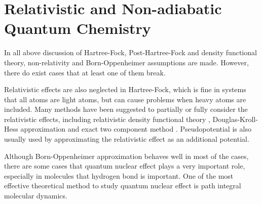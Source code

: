 \section{Relativistic and Non-adiabatic Quantum Chemistry}
In all above discussion of Hartree-Fock, Post-Hartree-Fock and density functional theory, non-relativity and Born-Oppenheimer assumptions are made.
However, there do exist cases that at least one of them break.

Relativistic effects are also neglected in Hartree-Fock, which is fine in systems that all atoms are light atoms, but can cause problems when heavy atoms are included. \cite{relativ}
Many methods have been suggested to partially or fully consider the relativistic effects, including relativistic density functional theory \cite{reladft}, Douglas-Kroll-Hess approximation \cite{dkh} and exact two component method \cite{x2c}.
Pseudopotential is also usually used by approximating the relativistic effect as an additional potential. \cite{relaqchem}

Although Born-Oppenheimer approximation behaves well in most of the cases, there are some cases that quantum nuclear effect plays a very important role, especially in molecules that hydrogen bond is important. \cite{tomqne}
One of the most effective theoretical method to study quantum nuclear effect is path integral molecular dynamics. \cite{pimd}

